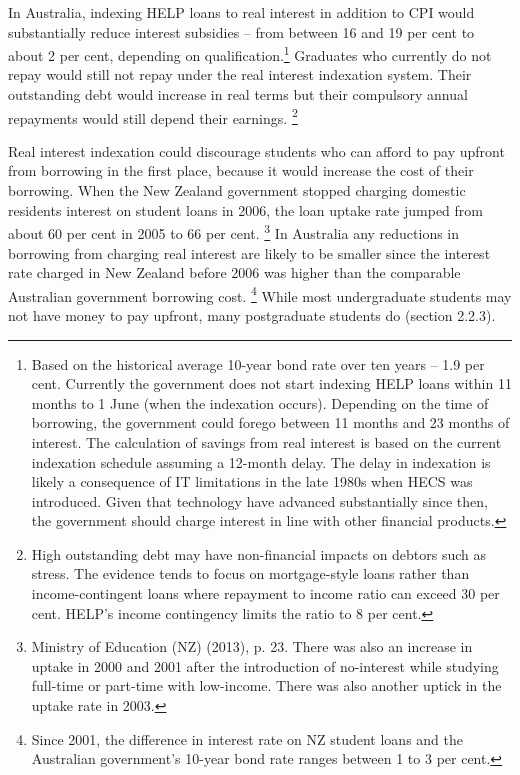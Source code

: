 \documentclass[embargoed]{grattan}
\begin{document}
In Australia, indexing HELP loans to real interest in addition to \gls{CPI} would substantially reduce interest subsidies -- from between 16 and 19 per cent to about 2 per cent, depending on qualification.\protect\hypertarget{_Ref335647424}{}{}\footnote{Based on the historical average 10-year bond rate over ten years -- 1.9 per cent.
Currently the government does not start indexing HELP loans within 11 months to 1 June (when the indexation occurs).
Depending on the time of borrowing, the government could forego between 11 months and 23 months of interest.
The calculation of savings from real interest is based on the current indexation schedule assuming a 12-month delay.
The delay in indexation is likely a consequence of IT limitations in the late 1980s when HECS was introduced.
Given that technology have advanced substantially since then, the government should charge interest in line with other financial products.} Graduates who currently do not repay would still not repay under the real interest indexation system.
Their outstanding debt would increase in real terms but their compulsory annual repayments would still depend their earnings.%
\footnote{High outstanding debt may have non-financial impacts on debtors such as stress.
The evidence tends to focus on mortgage-style loans rather than income-contingent loans where repayment to income ratio can exceed 30 per cent.
HELP's income contingency limits the ratio to 8 per cent.}

Real interest indexation could discourage students who can afford to pay upfront from borrowing in the first place, because it would increase the cost of their borrowing.
When the New Zealand government stopped charging domestic residents interest on student loans in 2006, the loan uptake rate jumped from about 60 per cent in 2005 to 66 per cent.%
\footnote{Ministry of Education (NZ) (2013), p. 23.
There was also an increase in uptake in 2000 and 2001 after the introduction of no-interest while studying full-time or part-time with low-income.
There was also another uptick in the uptake rate in 2003.} In Australia any reductions in borrowing from charging real interest are likely to be smaller since the interest rate charged in New Zealand before 2006 was higher than the comparable Australian government borrowing cost.%
\footnote{Since 2001, the difference in interest rate on NZ student loans and the Australian government's 10-year bond rate ranges between 1 to 3 per cent.} While most undergraduate students may not have money to pay upfront, many postgraduate students do (section 2.2.3).
\end{document}
